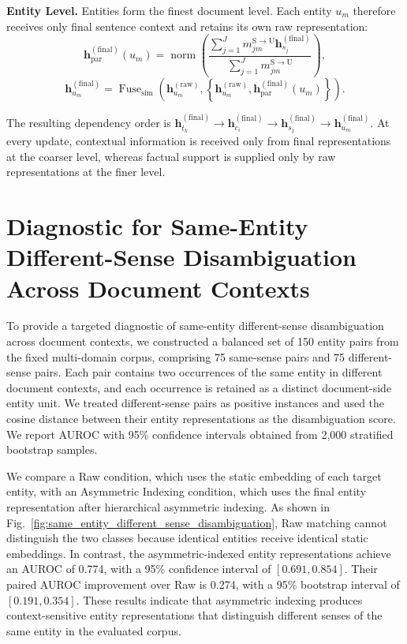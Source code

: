 \documentclass{article} %
\begin{document}
\smallskip
\noindent\textbf{Entity Level.}
Entities form the finest document level. Each entity $u_m$ therefore receives only final sentence context and retains its own raw representation:
\begin{equation}
\mathbf{h}_{\mathrm{par}}^{(\mathrm{final})}(u_m)
=
\operatorname{norm}\!\left(
\frac{
\sum_{j=1}^{J}
m_{jm}^{\mathrm{S}\to\mathrm{U}}
\mathbf{h}_{s_j}^{(\mathrm{final})}
}{
\sum_{j=1}^{J}m_{jm}^{\mathrm{S}\to\mathrm{U}}
}
\right),
\label{eq:entity_parent_context}
\end{equation}
\begin{equation}
\mathbf{h}_{u_m}^{(\mathrm{final})}
=
\operatorname{Fuse}_{\mathrm{sim}}\!\left(
\mathbf{h}_{u_m}^{(\mathrm{raw})},
\left\{
\mathbf{h}_{u_m}^{(\mathrm{raw})},
\mathbf{h}_{\mathrm{par}}^{(\mathrm{final})}(u_m)
\right\}
\right).
\label{eq:entity_final_representation}
\end{equation}

The resulting dependency order is
$\mathbf{h}_{t_k}^{(\mathrm{final})}
\rightarrow
\mathbf{h}_{c_i}^{(\mathrm{final})}
\rightarrow
\mathbf{h}_{s_j}^{(\mathrm{final})}
\rightarrow
\mathbf{h}_{u_m}^{(\mathrm{final})}$.
At every update, contextual information is received only from final representations at the coarser level, whereas factual support is supplied only by raw representations at the finer level.

\section{Diagnostic for Same-Entity Different-Sense Disambiguation Across Document Contexts}
\label{app:same_entity_different_sense_disambiguation}

To provide a targeted diagnostic of same-entity different-sense disambiguation across document contexts, we constructed a balanced set of 150 entity pairs from the fixed multi-domain corpus, comprising 75 same-sense pairs and 75 different-sense pairs. Each pair contains two occurrences of the same entity in different document contexts, and each occurrence is retained as a distinct document-side entity unit. We treated different-sense pairs as positive instances and used the cosine distance between their entity representations as the disambiguation score. We report AUROC with 95\% confidence intervals obtained from 2,000 stratified bootstrap samples.

We compare a Raw condition, which uses the static embedding of each target entity, with an Asymmetric Indexing condition, which uses the final entity representation after hierarchical asymmetric indexing. As shown in Fig.~\ref{fig:same_entity_different_sense_disambiguation}, Raw matching cannot distinguish the two classes because identical entities receive identical static embeddings. In contrast, the asymmetric-indexed entity representations achieve an AUROC of 0.774, with a 95\% confidence interval of $[0.691, 0.854]$. Their paired AUROC improvement over Raw is 0.274, with a 95\% bootstrap interval of $[0.191, 0.354]$. These results indicate that asymmetric indexing produces context-sensitive entity representations that distinguish different senses of the same entity in the evaluated corpus.
\end{document}
